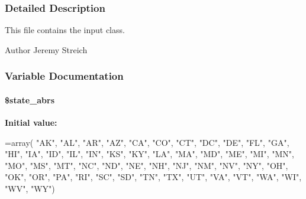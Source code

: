 \subsubsection{Detailed Description}
This file contains the input class. \begin{DoxyAuthor}{Author}
Jeremy Streich 
\end{DoxyAuthor}


\subsubsection{Variable Documentation}
\hypertarget{input_8inc_8php_a1728ce90487a81def9618f02a8365be9}{
\paragraph[{\$state\-\_\-abrs}]{\setlength{\rightskip}{0pt plus 5cm}\$state\-\_\-abrs}}\label{input_8inc_8php_a1728ce90487a81def9618f02a8365be9}
{\bfseries Initial value\-:}
\begin{DoxyCode}
=array( \textcolor{stringliteral}{"AK"}, \textcolor{stringliteral}{"AL"}, \textcolor{stringliteral}{"AR"}, \textcolor{stringliteral}{"AZ"}, \textcolor{stringliteral}{"CA"}, \textcolor{stringliteral}{"CO"}, \textcolor{stringliteral}{"CT"}, \textcolor{stringliteral}{"DC"},
      \textcolor{stringliteral}{"DE"}, \textcolor{stringliteral}{"FL"}, \textcolor{stringliteral}{"GA"}, \textcolor{stringliteral}{"HI"}, \textcolor{stringliteral}{"IA"}, \textcolor{stringliteral}{"ID"}, \textcolor{stringliteral}{"IL"}, \textcolor{stringliteral}{"IN"}, \textcolor{stringliteral}{"KS"}, \textcolor{stringliteral}{"KY"}, \textcolor{stringliteral}{"LA"},
      \textcolor{stringliteral}{"MA"}, \textcolor{stringliteral}{"MD"}, \textcolor{stringliteral}{"ME"}, \textcolor{stringliteral}{"MI"}, \textcolor{stringliteral}{"MN"}, \textcolor{stringliteral}{"MO"}, \textcolor{stringliteral}{"MS"}, \textcolor{stringliteral}{"MT"}, \textcolor{stringliteral}{"NC"}, \textcolor{stringliteral}{"ND"}, \textcolor{stringliteral}{"NE"},
      \textcolor{stringliteral}{"NH"}, \textcolor{stringliteral}{"NJ"}, \textcolor{stringliteral}{"NM"}, \textcolor{stringliteral}{"NV"}, \textcolor{stringliteral}{"NY"}, \textcolor{stringliteral}{"OH"}, \textcolor{stringliteral}{"OK"}, \textcolor{stringliteral}{"OR"}, \textcolor{stringliteral}{"PA"}, \textcolor{stringliteral}{"RI"}, \textcolor{stringliteral}{"SC"},
      \textcolor{stringliteral}{"SD"}, \textcolor{stringliteral}{"TN"}, \textcolor{stringliteral}{"TX"}, \textcolor{stringliteral}{"UT"}, \textcolor{stringliteral}{"VA"}, \textcolor{stringliteral}{"VT"}, \textcolor{stringliteral}{"WA"}, \textcolor{stringliteral}{"WI"}, \textcolor{stringliteral}{"WV"}, \textcolor{stringliteral}{"WY"})
\end{DoxyCode}
